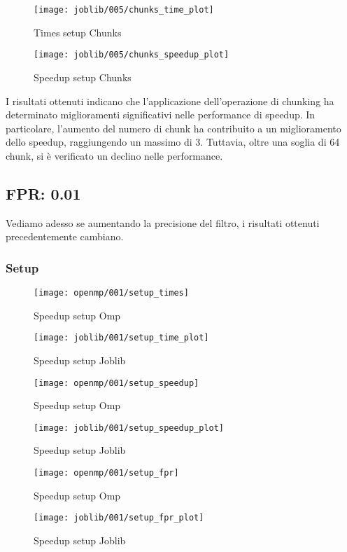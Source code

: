 \begin{figure}[H]
    \centering
    \texttt{[image: joblib/005/chunks\_time\_plot]}
        \caption{Times setup Chunks}\label{fig:005-chunks_time}
    \endminipage\hfill
    \texttt{[image: joblib/005/chunks\_speedup\_plot]}
        \caption{Speedup setup Chunks}\label{fig:005-chunks_speedup}
    \endminipage\hfill
\end{figure}

I risultati ottenuti indicano che l'applicazione dell'operazione di chunking ha determinato miglioramenti
significativi nelle performance di speedup.
In particolare, l'aumento del numero di chunk ha contribuito a un miglioramento dello speedup,
raggiungendo un massimo di 3.
Tuttavia, oltre una soglia di 64 chunk, si è verificato un declino nelle performance.

\subsection{FPR: 0.01}\label{subsec:fpr-001}
Vediamo adesso se aumentando la precisione del filtro, i risultati ottenuti precedentemente cambiano.

\subsubsection{Setup}\label{subsubsec:setup}
\begin{figure}[H]
    \centering
    \texttt{[image: openmp/001/setup\_times]}
        \caption{Speedup setup Omp}\label{fig:setup_time_omp}
    \endminipage\hfill
    \texttt{[image: joblib/001/setup\_time\_plot]}
        \caption{Speedup setup Joblib}\label{fig:setup_time_joblib}
    \endminipage\hfill
\end{figure}
\begin{figure}[H]
    \centering
    \texttt{[image: openmp/001/setup\_speedup]}
        \caption{Speedup setup Omp}\label{fig:setup_speedup_omp}
    \endminipage\hfill
    \texttt{[image: joblib/001/setup\_speedup\_plot]}
        \caption{Speedup setup Joblib}\label{fig:setup_speedup_joblib}
    \endminipage\hfill
\end{figure}
\begin{figure}[H]
    \centering
    \texttt{[image: openmp/001/setup\_fpr]}
        \caption{Speedup setup Omp}\label{fig:setup_fpr_omp}
    \endminipage\hfill
    \texttt{[image: joblib/001/setup\_fpr\_plot]}
        \caption{Speedup setup Joblib}\label{fig:setup_fpr_joblib}
    \endminipage\hfill
\end{figure}

